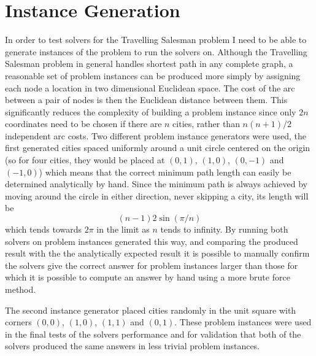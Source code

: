 \documentclass[12pt,a4paper,twoside,openright]{report}
\begin{document}
\section{Instance Generation}
In order to test solvers for the Travelling Salesman problem I need to be able to generate instances of the problem to run the solvers on. Although the Travelling Salesman problem in general handles shortest path in any complete graph, a reasonable set of problem instances can be produced more simply by assigning each node a location in two dimensional Euclidean space. The cost of the arc between a pair of nodes is then the Euclidean distance between them. This significantly reduces the complexity of building a problem instance since only $2n$ coordinates need to be chosen if there are $n$ cities, rather than $n(n+1)/2$ independent arc costs. Two different problem instance generators were used, the first generated cities spaced uniformly around a unit circle centered on the origin (so for four cities, they would be placed at $(0,1)$, $(1,0)$, $(0, -1)$ and $(-1, 0)$) which means that the correct minimum path length can easily be determined analytically by hand. Since the minimum path is always achieved by moving around the circle in either direction, never skipping a city, its length will be
$$
(n-1)2\sin(\pi/n)
$$
which tends towards $2\pi$ in the limit as $n$ tends to infinity. By running both solvers on problem instances generated this way, and comparing the produced result with the the analytically expected result it is possible to manually confirm the solvers give the correct answer for problem instances larger than those for which it is possible to compute an answer by hand using a more brute force method. 

The second instance generator placed cities randomly in the unit square with corners $(0,0)$, $(1,0)$, $(1,1)$ and $(0,1)$.  These problem instances were used in the final tests of the solvers performance and for validation that both of the solvers produced the same answers in less trivial problem instances.
\end{document}
